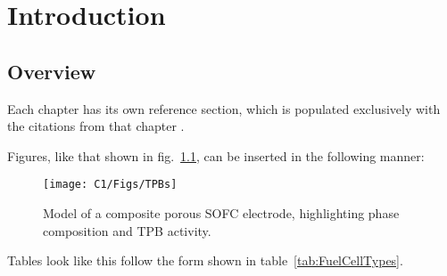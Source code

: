 \chapter{Introduction}

\section{Overview}

Each chapter has its own reference section, which is populated exclusively with the citations from that chapter \cite{Cooper13}.

Figures, like that shown in fig.~\ref{fig:TPBs}, can be inserted in the following manner:

\begin{figure}[H] %
  \centering
  \texttt{[image: C1/Figs/TPBs]}
  \caption{Model of a composite porous SOFC electrode, highlighting phase composition and TPB activity.}
  \label{fig:TPBs}
\end{figure}

Tables look like this follow the form shown in table~\ref{tab:FuelCellTypes}.


